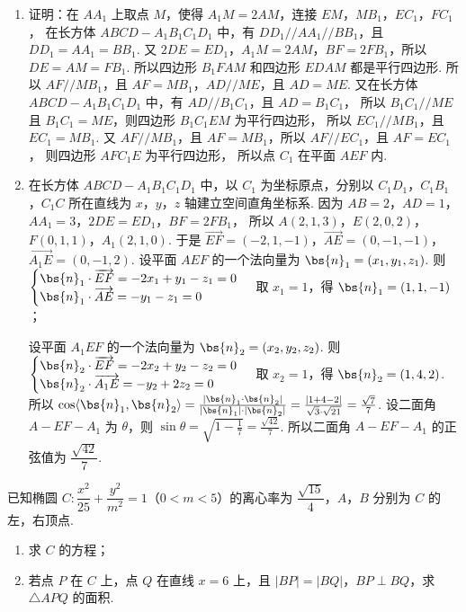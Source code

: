 \begin{solution}
\begin{enumerate}
\item 证明：在 \(AA_1\) 上取点 \(M\)，使得 \(A_1M=2AM\)，连接 \(EM\)，\(MB_1\)，\(EC_1\)，\(FC_1\)，
在长方体 \(ABCD-A_1B_1C_1D_1\) 中，有 \(DD_1//AA_1//BB_1\)，且 \(DD_1=AA_1=BB_1\).
又 \(2DE=ED_1\)，\(A_1M=2AM\)，\(BF=2FB_1\)，所以 \(DE=AM=FB_1\).
所以四边形 \(B_1FAM\) 和四边形 \(EDAM\) 都是平行四边形.
所以 \(AF//MB_1\)，且 \(AF=MB_1\)，\(AD//ME\)，且 \(AD=ME\).
又在长方体 \(ABCD-A_1B_1C_1D_1\) 中，有 \(AD//B_1C_1\)，且 \(AD=B_1C_1\)，
所以 \(B_1C_1//ME\) 且 \(B_1C_1=ME\)，则四边形 \(B_1C_1EM\) 为平行四边形，
所以 \(EC_1//MB_1\)，且 \(EC_1=MB_1\).
又 \(AF//MB_1\)，且 \(AF=MB_1\)，所以 \(AF//EC_1\)，且 \(AF=EC_1\)，
则四边形 \(AFC_1E\) 为平行四边形，
所以点 \(C_1\) 在平面 \(AEF\) 内.

\item 在长方体 \(ABCD-A_1B_1C_1D_1\) 中，以 \(C_1\) 为坐标原点，分别以 \(C_1D_1\)，\(C_1B_1\)，\(C_1C\) 所在直线为 \(x\)，\(y\)，\(z\) 轴建立空间直角坐标系.
因为 \(AB=2\)，\(AD=1\)，\(AA_1=3\)，\(2DE=ED_1\)，\(BF=2FB_1\)，
所以 \(A(2,1,3)\)，\(E(2,0,2)\)，\(F(0,1,1)\)，\(A_1(2,1,0)\).
于是 \(\overrightarrow{EF}=(-2,1,-1)\)，\(\overrightarrow{AE}=(0,-1,-1)\)，\(\overrightarrow{A_1E}=(0,-1,2)\).
设平面 \(AEF\) 的一个法向量为 \(\bs{n}_1=(x_1,y_1,z_1)\).
则 \(\begin{cases}
\bs{n}_1\cdot\overrightarrow{EF}=-2x_1+y_1-z_1=0\\
\bs{n}_1\cdot\overrightarrow{AE}=-y_1-z_1=0
\end{cases}\)
取 \(x_1=1\)，得 \(\bs{n}_1=(1,1,-1)\)；

设平面 \(A_1EF\) 的一个法向量为 \(\bs{n}_2=(x_2,y_2,z_2)\).
则 \(\begin{cases}
\bs{n}_2\cdot\overrightarrow{EF}=-2x_2+y_2-z_2=0\\
\bs{n}_2\cdot\overrightarrow{A_1E}=-y_2+2z_2=0
\end{cases}\)
取 \(x_2=1\)，得 \(\bs{n}_2=(1,4,2)\).
所以 \(\cos\langle \bs{n}_1,\bs{n}_2\rangle=\frac{|\bs{n}_1\cdot\bs{n}_2|}{|\bs{n}_1|\cdot|\bs{n}_2|}=\frac{|1+4-2|}{\sqrt{3}\cdot\sqrt{21}}=\frac{\sqrt{7}}{7}\).
设二面角 \(A-EF-A_1\) 为 \(\theta\)，则
\(\sin\theta=\sqrt{1-\frac{1}{7}}=\frac{\sqrt{42}}{7}\).
所以二面角 \(A-EF-A_1\) 的正弦值为 \(\dfrac{\sqrt{42}}{7}\).
\end{enumerate}
\end{solution}

\begin{problem}
已知椭圆 \(C:\dfrac{x^2}{25}+\dfrac{y^2}{m^2}=1\)（\(0<m<5\)）的离心率为 \(\dfrac{\sqrt{15}}{4}\)，\(A\)，\(B\) 分别为 \(C\) 的左，右顶点.

\begin{enumerate}
\item 求 \(C\) 的方程；
\item 若点 \(P\) 在 \(C\) 上，点 \(Q\) 在直线 \(x=6\) 上，且 \(|BP|=|BQ|\)，\(BP\perp BQ\)，求 \(\triangle APQ\) 的面积.
\end{enumerate}
\end{problem}

